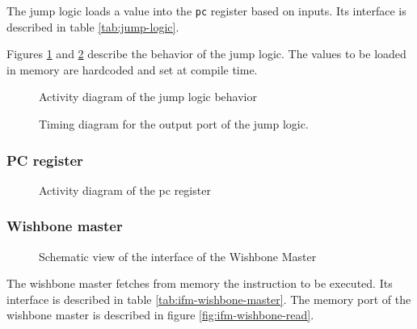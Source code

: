 \begin{content}
  The jump logic loads a value into the \texttt{pc} register based on inputs. Its interface is described in table \ref{tab:jump-logic}.
\end{content}



\begin{content}
\end{content}

\begin{content}
  Figures \ref{fig:jump-logic-behavior} and \ref{fig:jump-logic-output} describe the behavior of the jump logic. The values to be loaded in memory are hardcoded and set at compile time.
\end{content}

\begin{figure}[H]
    \centering
    
    \caption{Activity diagram of the jump logic behavior}
    \label{fig:jump-logic-behavior}
\end{figure}

\begin{figure}[H]
    \centering
    
    \caption{Timing diagram for the output port of the jump logic.}
    \label{fig:jump-logic-output}
\end{figure}

\subsubsection{PC register}

\begin{figure}[H]
    \centering
    
    \caption{Activity diagram of the pc register}
    \label{fig:pc-behavior}
\end{figure}

\subsubsection{Wishbone master}

\begin{figure}[H]
    \centering
    
    \caption{Schematic view of the interface of the Wishbone Master}
    \label{fig:ifm-wishbone-master}
\end{figure}

\begin{content}
  The wishbone master fetches from memory the instruction to be executed. Its interface is described in table \ref{tab:ifm-wishbone-master}.
  The memory port of the wishbone master is described in figure \ref{fig:ifm-wishbone-read}. 
\end{content}

